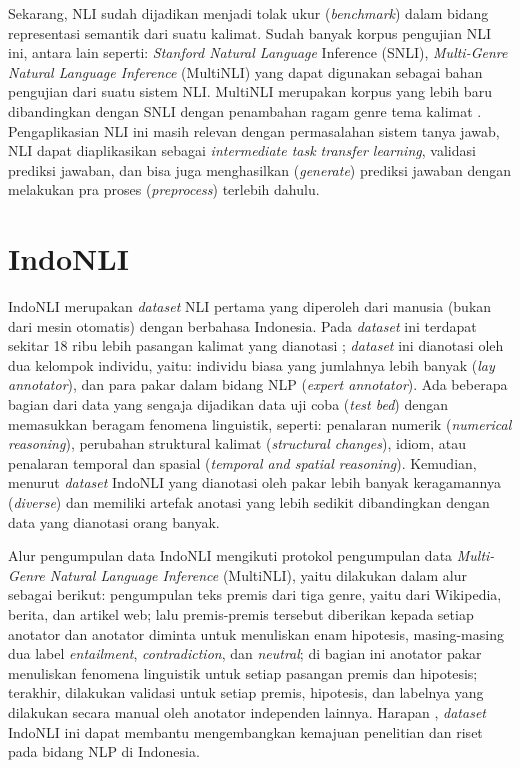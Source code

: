 Sekarang, NLI sudah dijadikan menjadi tolak ukur (\emph{benchmark}) dalam bidang representasi semantik dari suatu kalimat. Sudah banyak korpus pengujian NLI ini, antara lain seperti: \emph{Stanford Natural Language} Inference (SNLI), \emph{Multi-Genre Natural Language Inference} (MultiNLI) yang dapat digunakan sebagai bahan pengujian dari suatu sistem NLI. MultiNLI merupakan korpus yang lebih baru dibandingkan dengan SNLI dengan penambahan ragam genre tema kalimat \citep{williams-etal-2018-broad}. Pengaplikasian NLI ini masih relevan dengan permasalahan sistem tanya jawab, NLI dapat diaplikasikan sebagai \emph{intermediate task transfer learning}, validasi prediksi jawaban, dan bisa juga menghasilkan (\emph{generate}) prediksi jawaban dengan melakukan pra proses (\emph{preprocess}) terlebih dahulu.

\section{IndoNLI}
IndoNLI merupakan \emph{dataset} NLI pertama yang diperoleh dari manusia (bukan dari mesin otomatis) dengan berbahasa Indonesia. Pada \emph{dataset} ini terdapat sekitar 18 ribu lebih pasangan kalimat yang dianotasi \citep{mahendra-etal-2021-indonli}; \emph{dataset} ini dianotasi oleh dua kelompok individu, yaitu: individu biasa yang jumlahnya lebih banyak (\emph{lay annotator}), dan para pakar dalam bidang NLP (\emph{expert annotator}). Ada beberapa bagian dari data yang sengaja dijadikan data uji coba (\emph{test bed}) dengan memasukkan beragam fenomena linguistik, seperti: penalaran numerik (\emph{numerical reasoning}), perubahan struktural kalimat (\emph{structural changes}), idiom, atau penalaran temporal dan spasial (\emph{temporal and spatial reasoning}). Kemudian, menurut \citet{mahendra-etal-2021-indonli} \emph{dataset} IndoNLI yang dianotasi oleh pakar lebih banyak keragamannya (\emph{diverse}) dan memiliki artefak anotasi yang lebih sedikit dibandingkan dengan data yang dianotasi orang banyak.

Alur pengumpulan data IndoNLI mengikuti protokol pengumpulan data \emph{Multi-Genre Natural Language Inference} (MultiNLI), yaitu dilakukan dalam alur sebagai berikut: pengumpulan teks premis dari tiga genre, yaitu dari Wikipedia, berita, dan artikel web; lalu premis-premis tersebut diberikan kepada setiap anotator dan anotator diminta untuk menuliskan enam hipotesis, masing-masing dua label \emph{entailment}, \emph{contradiction}, dan \emph{neutral}; di bagian ini anotator pakar menuliskan fenomena linguistik untuk setiap pasangan premis dan hipotesis; terakhir, dilakukan validasi untuk setiap premis, hipotesis, dan labelnya yang dilakukan secara manual oleh anotator independen lainnya. Harapan \citet{mahendra-etal-2021-indonli}, \emph{dataset} IndoNLI ini dapat membantu mengembangkan kemajuan penelitian dan riset pada bidang NLP di Indonesia.

